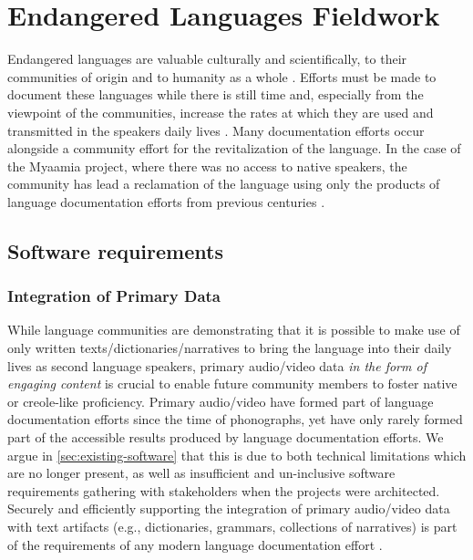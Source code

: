 \documentclass[11pt]{article}
\begin{document}
\section{Endangered Languages Fieldwork}\label{sec:fieldwork}

Endangered languages are valuable culturally and scientifically, to their
communities of origin \cite{Ironstrack:2012} and to humanity as a whole \cite{harrison2007languages}. Efforts must be made to document these languages while there is still time and,
especially from the viewpoint of the communities, increase the rates at which
they are used and transmitted in the speakers daily lives \cite{Myaamia:2001}. 
Many documentation efforts occur alongside a community effort for the revitalization of the language. 
In the case of the Myaamia project, where there was no access to native speakers, the community has lead a reclamation \cite{Leonard:2012} of the language using only the products of language documentation efforts from previous centuries \cite{Costa:2012}.

\subsection{Software requirements}
\label{sec:requirements}


\subsubsection{Integration of Primary Data}
 While language communities are demonstrating that it is possible to make use of only written texts/dictionaries/narratives to bring the language into their daily lives as second language speakers, 
 primary audio/video data \emph{in the form of engaging content} is crucial to enable future community members to foster native or creole-like proficiency. 
 Primary audio/video  have formed part of  language documentation efforts since the time of phonographs, yet have only rarely formed part of the accessible results produced by language documentation efforts. 
 We argue in \autoref{sec:existing-software} that this is  due to both technical limitations which are no longer present, as well as insufficient and un-inclusive software requirements gathering with stakeholders when the projects were architected. 
Securely and efficiently supporting the integration of primary audio/video data with text artifacts
(e.g., dictionaries, grammars, collections of narratives) is part of the requirements of any modern language documentation effort \cite{Schroeter:2006} \cite{Good:2012b}. 
\end{document}
